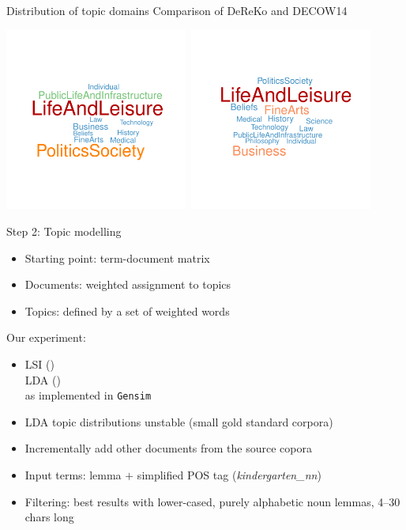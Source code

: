 \documentclass{beamer}
\begin{document}
\begin{frame}
  {Distribution of topic domains}
  Comparison of DeReKo and DECOW14\\[1cm]
  \begin{center}
    \includegraphics[width=0.45\textwidth]{dereko}~\includegraphics[width=0.45\textwidth]{cow}
  \end{center}
\end{frame}

\begin{frame}
  {Step 2: Topic modelling}

  \begin{itemize}
    \item Starting point: term-document matrix
    \item Documents: weighted assignment to topics
    \item Topics: defined by a set of weighted words
  \end{itemize}

  Our experiment:
  \begin{itemize}
    \item LSI (\citealp{LandauerDumais1994})\\
          LDA (\citealp{BleiEa2003})\\
          as implemented in \texttt{Gensim} \citep{RehurekSojka2010}%
    \item LDA topic distributions unstable (small gold standard corpora)
    \item Incrementally add other documents from the source copora
     \vspace{.25cm}
    \item Input terms: lemma $+$ simplified POS tag (\textit{kindergarten\_nn}) 
    \item Filtering: best results with lower-cased, purely alphabetic noun lemmas, 4--30 chars long
    \end{itemize}
\end{frame}
\end{document}
